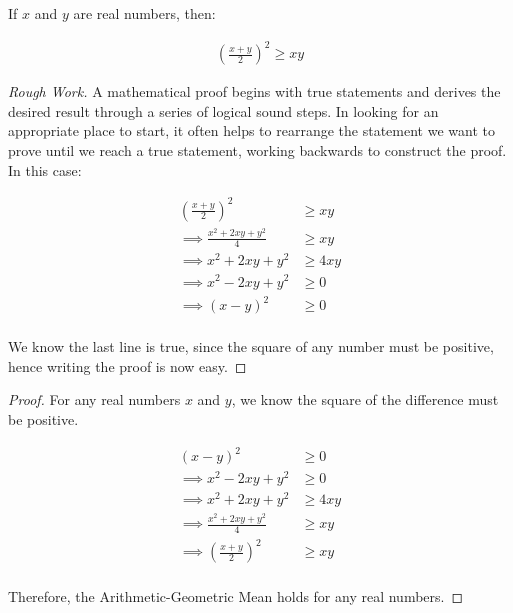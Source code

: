 \documentclass{report}
\begin{document}
\begin{theorem} If $x$ and $y$ are real numbers, then:

\begin{align}
	\left( \frac{x + y}{2} \right)^2 \ge xy
\end{align}
	
\end{theorem}
\begin{proof}[Rough Work]\let\qed\relax
	A mathematical proof begins with true statements and derives the desired result through a series of logical sound steps. In looking for an appropriate place to start, it often helps to rearrange the statement we want to prove until we reach a true statement, working backwards to construct the proof. In this case:
	
	\begin{align*}
		\left( \frac{x + y}{2} \right)^2 &\ge xy \\
		\implies \frac{x^2 + 2xy + y^2}{4} &\ge xy \\
		\implies x^2 + 2xy + y^2 &\ge 4xy \\
		\implies x^2 - 2xy + y^2 &\ge 0 \\
		\implies (x - y)^2 &\ge 0\\
	\end{align*}
	
	We know the last line is true, since the square of any number must be positive, hence writing the proof is now easy.
\end{proof}
\vspace{\baselineskip}

\begin{proof}
	For any real numbers $x$ and $y$, we know the square of the difference must be positive.
	
	\begin{align*}
		(x - y)^2 &\ge 0 \\
		\implies x^2 - 2xy + y^2 &\ge 0 \\
		\implies x^2 + 2xy + y^2 &\ge 4xy \\
		\implies \frac{x^2 + 2xy + y^2}{4} &\ge xy \\
		\implies \left( \frac{x + y}{2} \right)^2 &\ge xy \\
	\end{align*}
	
	Therefore, the Arithmetic-Geometric Mean holds for any real numbers.
\end{proof}
\vspace{\baselineskip}
\end{document}
